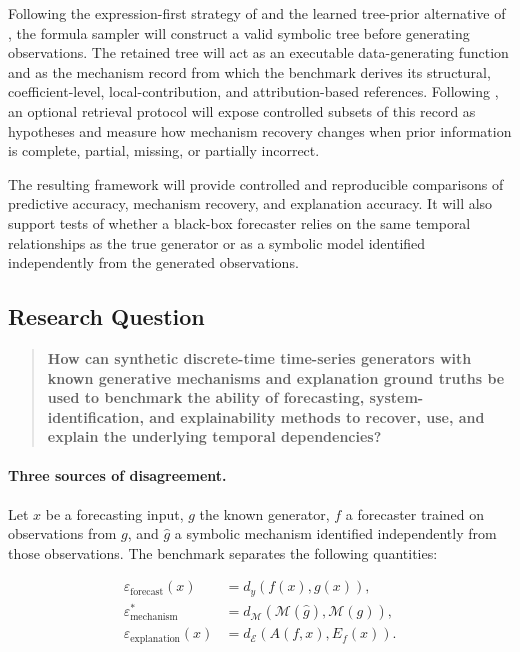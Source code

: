 Following the expression-first strategy of \citet{dascoli2022deep} and the
learned tree-prior alternative of \citet{meznar2023efficient}, the formula
sampler will construct a valid symbolic tree before generating observations.
The retained tree will act as an executable data-generating function and as the
mechanism record from which the benchmark derives its structural,
coefficient-level, local-contribution, and attribution-based references.
Following \citet{bendinelli2023controllable}, an optional retrieval protocol
will expose controlled subsets of this record as hypotheses and measure how
mechanism recovery changes when prior information is complete, partial,
missing, or partially incorrect.

The resulting framework will provide controlled and reproducible comparisons
of predictive accuracy, mechanism recovery, and explanation accuracy. It will
also support tests of whether a black-box forecaster relies on the same
temporal relationships as the true generator or as a symbolic model identified
independently from the generated observations.

\subsection{\texorpdfstring{\hspace{0.45em}Research Question}{Research Question}}

\begin{quote}
\textbf{How can synthetic discrete-time time-series generators with known
generative mechanisms and explanation ground truths be used to benchmark the
ability of forecasting, system-identification, and explainability methods to
recover, use, and explain the underlying temporal dependencies?}
\end{quote}

\paragraph{Three sources of disagreement.}
Let $x$ be a forecasting input, $g$ the known generator, $f$ a forecaster
trained on observations from $g$, and $\widehat g$ a symbolic mechanism
identified independently from those observations. The benchmark separates the
following quantities:

\begin{align}
\varepsilon_{\mathrm{forecast}}(x)
&=d_y\!\left(f(x),g(x)\right),
\label{eq:forecast-error}\\
\varepsilon_{\mathrm{mechanism}}^{*}
&=d_{\mathcal M}\!\left(\mathcal M(\widehat g),\mathcal M(g)\right),
\label{eq:mechanism-error}\\
\varepsilon_{\mathrm{explanation}}(x)
&=d_{\mathcal E}\!\left(A(f,x),E_f(x)\right).
\label{eq:explanation-error}
\end{align}


